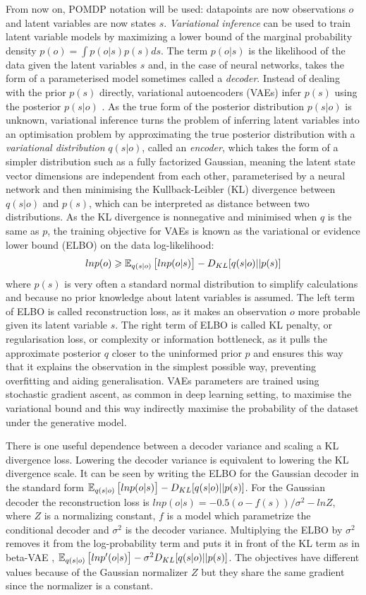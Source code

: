 From now on, POMDP notation will be used: datapoints are now observations $o$ and latent variables are now states $s$. \textit{Variational inference} can be used to train latent variable models by maximizing a lower bound of the marginal probability density $p(o) = \int p(o|s)p(s)ds$. The term $p(o|s)$ is the likelihood of the data given the latent variables $s$ and, in the case of neural networks, takes the form of a parameterised model sometimes called a \textit{decoder}. Instead of dealing with the prior $p(s)$ directly, variational autoencoders (VAEs) infer $p(s)$ using the posterior $p(s|o)$ \cite{Algo.VAE}. As the true form of the posterior distribution $p(s|o)$ is unknown, variational inference turns the problem of inferring latent variables into an optimisation problem by approximating the true posterior distribution with a \textit{variational distribution} $q(s|o)$, called an \textit{encoder}, which takes the form of a simpler distribution such as a fully factorized Gaussian, meaning the latent state vector dimensions are independent from each other, parameterised by a neural network and then minimising the Kullback-Leibler (KL) divergence between $q(s|o)$ and $p(s)$, which can be interpreted as distance between two distributions. As the KL divergence is nonnegative and minimised when $q$ is the same as $p$, the training objective for VAEs is known as the variational or evidence lower bound (ELBO) on the data log-likelihood:
$$ln p(o) \geqslant \operatorname{\mathbb{E}}_{q(s|o)}\big[ ln p(o|s) \big] - D_{KL}[q(s|o)||p(s)]$$
where $p(s)$ is very often a standard normal distribution to simplify calculations and because no prior knowledge about latent variables is assumed. The left term of ELBO is called reconstruction loss, as it makes an observation $o$ more probable given its latent variable $s$. The right term of ELBO is called KL penalty, or regularisation loss, or complexity or information bottleneck, as it pulls the approximate posterior $q$ closer to the uninformed prior $p$ and ensures this way that it explains the observation in the simplest possible way, preventing overfitting and aiding generalisation. VAEs parameters are trained using stochastic gradient ascent, as common in deep learning setting, to maximise the variational bound and this way indirectly maximise the probability of the dataset under the generative model.

There is one useful dependence between a decoder variance and scaling a KL divergence loss. Lowering the decoder variance is equivalent to lowering the KL divergence scale. It can be seen by writing the ELBO for the Gaussian decoder in the standard form $\operatorname{\mathbb{E}}_{q(s|o)}\big[ ln p(o|s) \big] - D_{KL}[q(s|o)||p(s)]$. For the Gaussian decoder the reconstruction loss is $lnp(o|s) = -0.5(o-f(s))/\sigma^2-lnZ$, where $Z$ is a normalizing constant, $f$ is a model which parametrize the conditional decoder and $\sigma^2$ is the decoder variance. Multiplying the ELBO by $\sigma^2$ removes it from the log-probability term and puts it in front of the KL term as in beta-VAE \cite{Algo.betaVAE}, $\operatorname{\mathbb{E}}_{q(s|o)}\big[ ln p'(o|s) \big] - \sigma^2 D_{KL}[q(s|o)||p(s)]$. The objectives have different values because of the Gaussian normalizer $Z$ but they share the same gradient since the normalizer is a constant.

